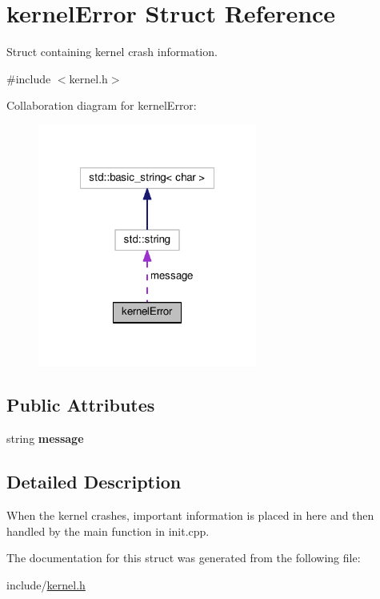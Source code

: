 \hypertarget{structkernelError}{\section{kernel\-Error \-Struct \-Reference}
\label{dc/d4b/structkernelError}
}


\-Struct containing kernel crash information.  




{\ttfamily \#include $<$kernel.\-h$>$}



\-Collaboration diagram for kernel\-Error\-:\nopagebreak
\begin{figure}[H]
\begin{center}
\leavevmode
\includegraphics[width=204pt]{dc/df6/structkernelError__coll__graph}
\end{center}
\end{figure}
\subsection*{\-Public \-Attributes}
\begin{DoxyCompactItemize}
\item 
\hypertarget{structkernelError_a047e3e93719a3267825e891fe9285981}{string {\bfseries message}}\label{dc/d4b/structkernelError_a047e3e93719a3267825e891fe9285981}

\end{DoxyCompactItemize}


\subsection{\-Detailed \-Description}
\-When the kernel crashes, important information is placed in here and then handled by the main function in init.\-cpp. 

\-The documentation for this struct was generated from the following file\-:\begin{DoxyCompactItemize}
\item 
include/\hyperlink{kernel_8h}{kernel.\-h}\end{DoxyCompactItemize}
